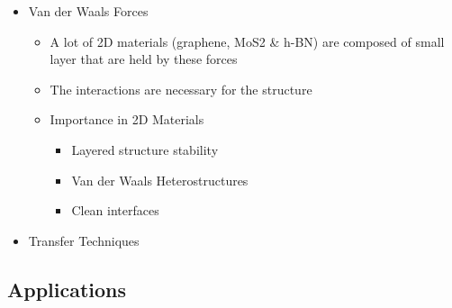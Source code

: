 \documentclass[conference]{IEEEtran}
\begin{document}
\begin{itemize}
\begin{itemize}
\begin{itemize}
        \end{itemize}

    \end{itemize}

  \item Van der Waals Forces 

    \begin{itemize}

      \item A lot of 2D materials (graphene, MoS2 \& h-BN) are composed of small layer that are held by these forces 

      \item The interactions are necessary for the structure 

      \item Importance in 2D Materials 

        \begin{itemize}

          \item Layered structure stability 

          \item Van der Waals Heterostructures 

          \item Clean interfaces 

        \end{itemize}

    \end{itemize}

  \item Transfer Techniques 

\end{itemize}

\subsection{Applications}
\end{document}
